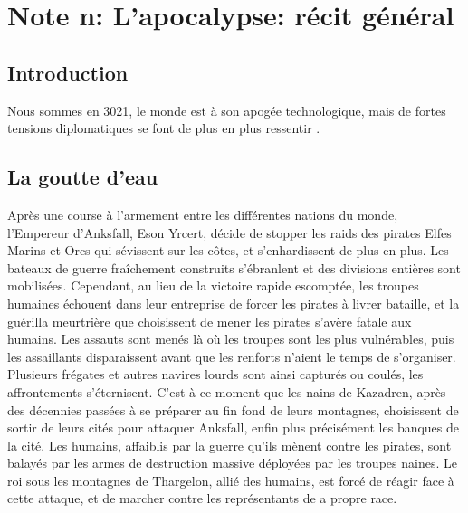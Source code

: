 \section{Note n: L'apocalypse: récit général}
\subsection{Introduction}
Nous sommes en 3021, le monde est à son apogée technologique, mais de fortes tensions diplomatiques se font de plus en plus ressentir .
\subsection{La goutte d'eau}
Après une course à l'armement entre les différentes nations du monde, l'Empereur d'Anksfall, Eson Yrcert, décide de stopper les raids des pirates Elfes Marins et Orcs qui sévissent sur les côtes, et s'enhardissent de plus en plus. Les bateaux de guerre fraîchement construits s'ébranlent et des divisions entières sont mobilisées. Cependant, au lieu de la victoire rapide escomptée, les troupes humaines échouent dans leur entreprise de forcer les pirates à livrer bataille, et la guérilla meurtrière que choisissent de mener les pirates s'avère fatale aux humains. Les assauts sont menés là où les troupes sont les plus vulnérables, puis les assaillants disparaissent avant que les renforts n'aient le temps de s'organiser. Plusieurs frégates et autres navires lourds sont ainsi capturés ou coulés, les affrontements s'éternisent. C'est à ce moment que les nains de Kazadren, après des décennies passées à se préparer au fin fond de leurs montagnes, choisissent de sortir de leurs cités pour attaquer Anksfall, enfin plus précisément les banques de la cité. Les humains, affaiblis par la guerre qu'ils mènent contre les pirates, sont balayés par les armes de destruction massive déployées par les troupes naines. Le roi sous les montagnes de Thargelon, allié des humains, est forcé de réagir face à cette attaque, et de marcher contre les représentants de a propre race. 
